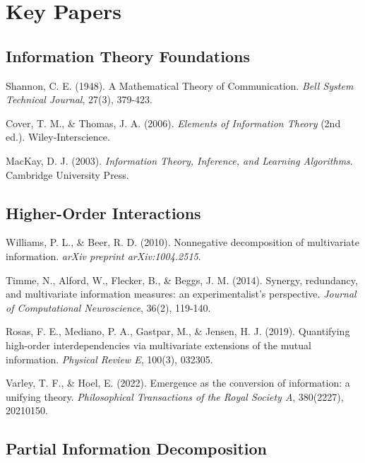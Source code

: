 \documentclass[
  11pt,
  letterpaper,
  oneside,
  openany]{book}
\begin{document}
\section*{Key Papers}\label{key-papers-1}


\subsection*{Information Theory
Foundations}\label{information-theory-foundations}

\label{refs-foundations}
Shannon, C. E. (1948). A Mathematical Theory of Communication.
\emph{Bell System Technical Journal}, 27(3), 379-423.

Cover, T. M., \& Thomas, J. A. (2006). \emph{Elements of Information
Theory} (2nd ed.). Wiley-Interscience.

MacKay, D. J. (2003). \emph{Information Theory, Inference, and Learning
Algorithms}. Cambridge University Press.

\subsection*{Higher-Order Interactions}\label{higher-order-interactions}

\label{refs-hoi}
Williams, P. L., \& Beer, R. D. (2010). Nonnegative decomposition of
multivariate information. \emph{arXiv preprint arXiv:1004.2515}.

Timme, N., Alford, W., Flecker, B., \& Beggs, J. M. (2014). Synergy,
redundancy, and multivariate information measures: an experimentalist's
perspective. \emph{Journal of Computational Neuroscience}, 36(2),
119-140.

Rosas, F. E., Mediano, P. A., Gastpar, M., \& Jensen, H. J. (2019).
Quantifying high-order interdependencies via multivariate extensions of
the mutual information. \emph{Physical Review E}, 100(3), 032305.

Varley, T. F., \& Hoel, E. (2022). Emergence as the conversion of
information: a unifying theory. \emph{Philosophical Transactions of the
Royal Society A}, 380(2227), 20210150.

\subsection*{Partial Information
Decomposition}\label{partial-information-decomposition}
\end{document}
